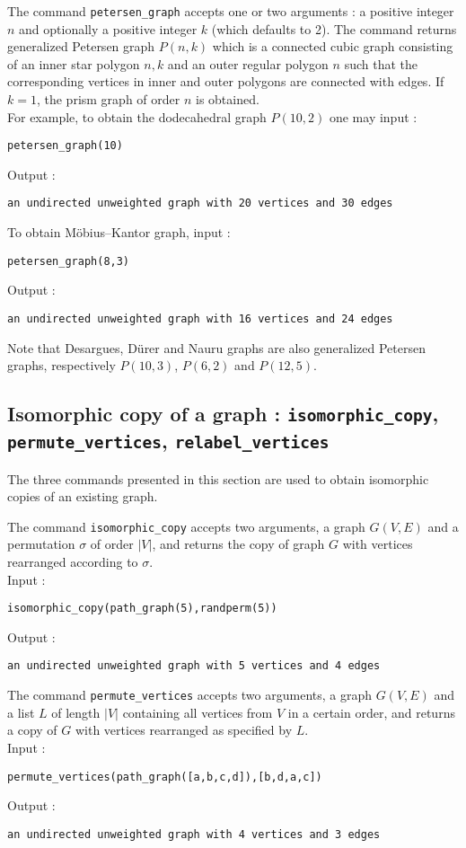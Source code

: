 \documentclass[a4paper,11pt]{article}
\begin{document}
The command {\tt petersen\_graph} accepts one or two arguments : a positive integer $ n $ and optionally a positive integer $ k $ (which defaults to 2). The command returns generalized Petersen graph $ P(n,k) $ which is a connected cubic graph consisting of an inner star polygon $ {n,k} $ and an outer regular polygon $ {n} $ such that the corresponding vertices in inner and outer polygons are connected with edges. If $ k=1 $, the prism graph of order $ n $ is obtained.\\
For example, to obtain the dodecahedral graph $ P(10,2) $ one may input :
\begin{center}
  \tt petersen\_graph(10)
\end{center}
Output :
\begin{center}
  \tt an undirected unweighted graph with 20 vertices and 30 edges
\end{center}
To obtain M\"obius--Kantor graph, input :
\begin{center}
  \tt petersen\_graph(8,3)
\end{center}
Output :
\begin{center}
  \tt an undirected unweighted graph with 16 vertices and 24 edges
\end{center}
Note that Desargues, D\"urer and Nauru graphs are also generalized Petersen graphs, respectively $ P(10,3) $, $ P(6,2) $ and $ P(12,5) $.

\subsection{Isomorphic copy of a graph : {\tt isomorphic\_copy}, {\tt permute\_vertices}, {\tt relabel\_vertices}}

The three commands presented in this section are used to obtain isomorphic copies of an existing graph. 

The command {\tt isomorphic\_copy} accepts two arguments, a graph $ G(V,E) $ and a permutation $ \sigma $ of order $ |V| $, and returns the copy of graph $ G $ with vertices rearranged according to $ \sigma $.\\
Input :
\begin{center}
  \tt isomorphic\_copy(path\_graph(5),randperm(5))
\end{center}
Output :
\begin{center}
  \tt an undirected unweighted graph with 5 vertices and 4 edges
\end{center}

The command {\tt permute\_vertices} accepts two arguments, a graph $ G(V,E) $ and a list $ L $ of length $ |V| $ containing all vertices from $ V $ in a certain order, and returns a copy of $ G $ with vertices rearranged as specified by $ L $.\\
Input :
\begin{center}
  \tt permute\_vertices(path\_graph([a,b,c,d]),[b,d,a,c])
\end{center}
Output :
\begin{center}
  \tt an undirected unweighted graph with 4 vertices and 3 edges
\end{center}
\end{document}
